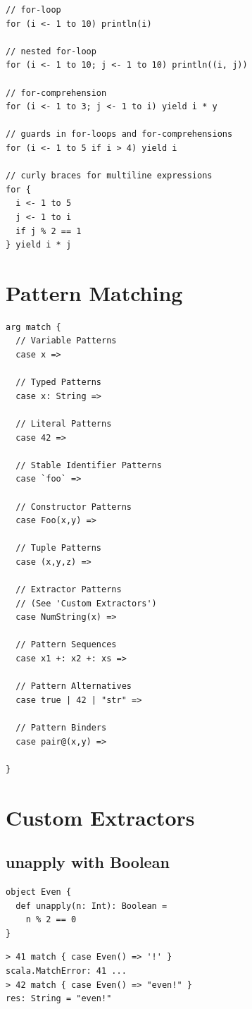\documentclass[10pt,landscape,a4paper]{article}
\begin{document}
\begin{multicols*}{4}
\begin{verbatim}
// for-loop
for (i <- 1 to 10) println(i)

// nested for-loop
for (i <- 1 to 10; j <- 1 to 10) println((i, j))

// for-comprehension
for (i <- 1 to 3; j <- 1 to i) yield i * y

// guards in for-loops and for-comprehensions
for (i <- 1 to 5 if i > 4) yield i

// curly braces for multiline expressions
for {
  i <- 1 to 5
  j <- 1 to i
  if j % 2 == 1
} yield i * j
\end{verbatim}
  \section{Pattern Matching}

\begin{verbatim}
arg match {
  // Variable Patterns
  case x =>

  // Typed Patterns
  case x: String =>

  // Literal Patterns
  case 42 =>

  // Stable Identifier Patterns
  case `foo` =>

  // Constructor Patterns
  case Foo(x,y) =>

  // Tuple Patterns
  case (x,y,z) =>

  // Extractor Patterns
  // (See 'Custom Extractors')
  case NumString(x) =>

  // Pattern Sequences
  case x1 +: x2 +: xs =>

  // Pattern Alternatives
  case true | 42 | "str" =>

  // Pattern Binders
  case pair@(x,y) =>

}
\end{verbatim}

  \section{Custom Extractors}

  \subsection{unapply with Boolean}

\begin{verbatim}
object Even {
  def unapply(n: Int): Boolean =
    n % 2 == 0
}
\end{verbatim}

\begin{verbatim}
> 41 match { case Even() => '!' }
scala.MatchError: 41 ...
> 42 match { case Even() => "even!" }
res: String = "even!"
\end{verbatim}


\end{multicols*}
\end{document}
